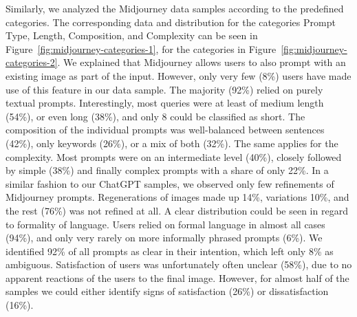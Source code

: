 Similarly, we analyzed the Midjourney data samples according to the predefined categories.
The corresponding data and distribution for the categories Prompt Type, Length, Composition, and
Complexity can be seen in Figure~\ref{fig:midjourney-categories-1}, for the categories in Figure~\ref{fig:midjourney-categories-2}.
We explained that Midjourney allows users to also prompt with an existing image as part of the
input.
However, only very few (8\%) users have made use of this feature in our data sample.
The majority (92\%) relied on purely textual prompts.
Interestingly, most queries were at least of medium length (54\%), or even long (38\%), and only 8
could be classified as short.
The composition of the individual prompts was well-balanced between sentences (42\%), only keywords
(26\%), or a mix of both (32\%).
The same applies for the complexity.
Most prompts were on an intermediate level (40\%), closely followed by simple (38\%) and finally
complex prompts with a share of only 22\%.
In a similar fashion to our ChatGPT samples, we observed only few refinements of Midjourney prompts.
Regenerations of images made up 14\%, variations 10\%, and the rest (76\%) was not refined at all.
A clear distribution could be seen in regard to formality of language.
Users relied on formal language in almost all cases (94\%), and only very rarely on more informally
phrased prompts (6\%).
We identified 92\% of all prompts as clear in their intention, which left only 8\% as ambiguous.
Satisfaction of users was unfortunately often unclear (58\%), due to no apparent reactions of the
users to the final image.
However, for almost half of the samples we could either identify signs of satisfaction (26\%) or
dissatisfaction (16\%).



